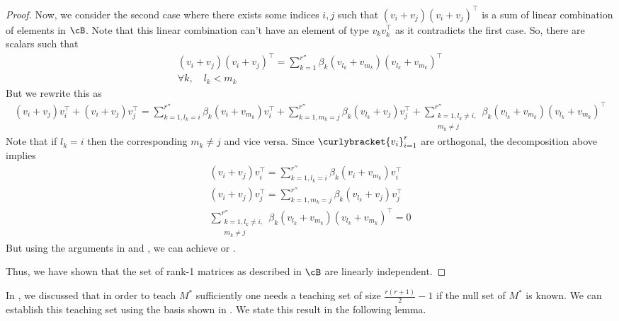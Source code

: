 \begin{proof}
    Now, we consider the second case where there exists some indices $i,j$ such that $(v_i + v_j)(v_i+v_j)^{\top}$ is a sum of linear combination of elements in $\cB$. Note that this linear combination can't have an element of type $v_kv_k^{\top}$ as it contradicts the first case. So, there are scalars such that
    \begin{gather}
        (v_i + v_j)(v_i+v_j)^{\top} = \sum_{k = 1}^{r''} \beta_{k}(v_{l_k} + v_{m_k})(v_{l_k} + v_{m_k})^{\top}\\
        \forall k,\quad l_k < m_k
    \end{gather}
    But we rewrite this as 
    \begin{align*}
        (v_i + v_j)v_i^{\top} + (v_i + v_j)v_j^{\top} = \sum_{k = 1, l_k = i}^{r''} \beta_{k}(v_{i} + v_{m_k})v_{i}^{\top} + \sum_{k = 1, m_k = j}^{r''} \beta_{k}(v_{l_k} + v_{j})v_{j}^{\top} + \sum_{\substack{k = 1, l_k \neq i,\\ m_k \neq j}}^{r''} \beta_{k}(v_{l_k} + v_{m_k})(v_{l_k} + v_{m_k})^{\top}
    \end{align*}
    Note that if $l_k = i$ then the corresponding $m_k \neq j$ and vice versa. Since $\curlybracket{v_i}_{i=1}^r$ are orthogonal, the decomposition above implies
    \begin{gather}
        (v_i + v_j)v_i^{\top} = \sum_{k = 1, l_k = i}^{r''} \beta_{k}(v_{i} + v_{m_k})v_{i}^{\top} \label{eq: vplusv1}\\
        (v_i + v_j)v_j^{\top} =  \sum_{k = 1, m_k = j}^{r''} \beta_{k}(v_{l_k} + v_{j})v_{j}^{\top}\label{eq: vplusv2}\\
        \sum_{\substack{k = 1, l_k \neq i,\\ m_k \neq j}}^{r''} \beta_{k}(v_{l_k} + v_{m_k})(v_{l_k} + v_{m_k})^{\top} = 0
    \end{gather}
    But using the arguments in  and , we can achieve  or .

    Thus, we have shown that the set of rank-1 matrices as described in $\cB$ are linearly independent.
\end{proof}
In , we discussed that in order to teach $M^*$ sufficiently one needs a teaching set of size $\frac{r(r+1)}{2} -1$ if the null set of $M^*$ is known. We can establish this teaching set using the basis shown in . We state this result in the following lemma.
